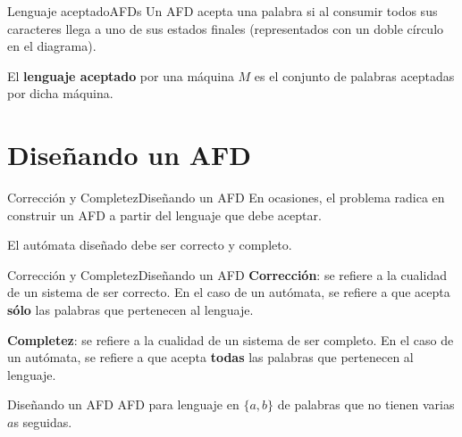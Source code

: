 \documentclass[spanish, handout]{beamer}
\newcommand\blfootnote[1]{%
  \begingroup
  \renewcommand\thefootnote{}\footnote{#1}%
  \addtocounter{footnote}{-1}%
  \endgroup
}
\begin{document}
\begin{frame}{Lenguaje aceptado}{AFDs}
    Un AFD \alert{acepta} una palabra si al consumir todos sus caracteres llega a uno de sus estados finales (representados con un doble círculo en el diagrama). \pause
    
    \bigskip

    El \textbf{lenguaje aceptado} por una máquina $M$ es el conjunto de palabras aceptadas por dicha máquina.
\end{frame}

\section{Diseñando un AFD}
\label{sec:afd-design}

\begin{frame}{Corrección y Completez}{Diseñando un AFD}
    En ocasiones, el problema radica en construir un AFD a partir del lenguaje que debe aceptar. \pause

    \bigskip

    El autómata diseñado debe ser \alert{correcto} y \alert{completo}.
\end{frame}

\begin{frame}{Corrección y Completez}{Diseñando un AFD}
    \textbf{Corrección}: se refiere a la cualidad de un sistema de ser \alert{correcto}. En el caso de un autómata, se refiere a que acepta \textbf{sólo} las palabras que pertenecen al lenguaje. \pause

    \bigskip
    
    \textbf{Completez}: se refiere a la cualidad de un sistema de ser \alert{completo}. En el caso de un autómata, se refiere a que acepta \textbf{todas} las palabras que pertenecen al lenguaje.
\end{frame}

\begin{frame}{Diseñando un AFD}
    AFD para lenguaje en $\{a,b\}$ de palabras que no tienen varias $a$s seguidas.

    \begin{center}
    \end{center}
\end{frame}
\end{document}
